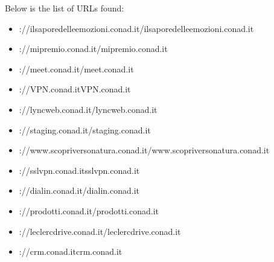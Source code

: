 \documentclass{article}
\begin{document}
Below is the list of URLs found:

\begin{itemize}
    
        
        
        \item \hrefhttp://ilsaporedelleemozioni.conad.it/ilsaporedelleemozioni.conad.it
    
        
        
        \item \hrefhttps://mipremio.conad.it/mipremio.conad.it
    
        
        
        \item \hrefhttps://meet.conad.it/meet.conad.it
    
        
        
        \item \hrefhttp://VPN.conad.itVPN.conad.it
    
        
        
        \item \hrefhttps://lyncweb.conad.it/lyncweb.conad.it
    
        
        
        \item \hrefhttp://staging.conad.it/staging.conad.it
    
        
        
        \item \hrefhttps://www.scopriversonatura.conad.it/www.scopriversonatura.conad.it
    
        
        
        \item \hrefhttp://sslvpn.conad.itsslvpn.conad.it
    
        
        
        \item \hrefhttps://dialin.conad.it/dialin.conad.it
    
        
        
        \item \hrefhttp://prodotti.conad.it/prodotti.conad.it
    
        
        
        \item \hrefhttp://leclercdrive.conad.it/leclercdrive.conad.it
    
        
        
        \item \hrefhttp://crm.conad.itcrm.conad.it
    

\end{itemize}
\end{document}
